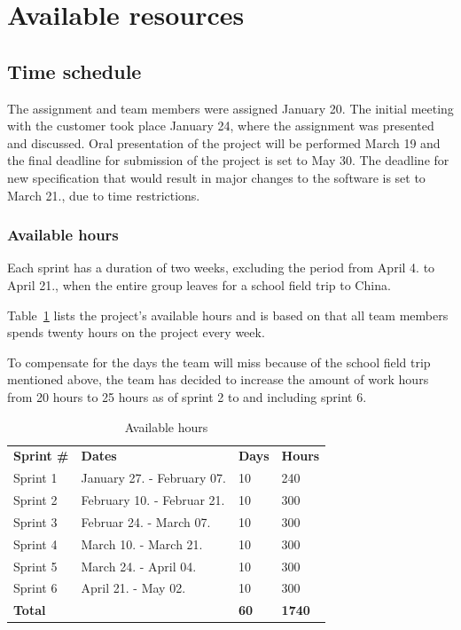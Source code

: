 \section{Available resources}
\subsection{Time schedule}
The assignment and team members were assigned January 20. The initial meeting with the customer took place January 24, where the assignment was presented and discussed. Oral presentation of the project will be performed March 19 and the final deadline for submission of the project is set to May 30. The deadline for new specification that would result in major changes to the software is set to March 21., due to time restrictions.

\subsubsection{Available hours}
Each sprint has a duration of two weeks, excluding the period from April 4. to April 21., when the entire group leaves for a school field trip to China.

Table~\ref{tab:availHours} lists the project's available hours and is based on that all team members spends twenty hours on the project every week.

To compensate for the days the team will miss because of the school field trip mentioned above, the team has decided to increase the amount of work hours from 20 hours to 25 hours as of sprint 2 to and including sprint 6.

\begin{table}[H]
\centering
{}
\begin{tabular}{|l|l|l|l|}
\hline
\textbf{Sprint \#} & \textbf{Dates} & \textbf{Days} & \textbf{Hours}\\
Sprint 1& January 27. - February 07. & 10  & 240 \\
Sprint 2 & February 10. - Februar 21. &10  & 300 \\
Sprint 3 & Februar 24. - March 07. &10 & 300 \\
Sprint 4 & March 10. - March 21. &10  &300 \\
Sprint 5 & March 24. - April 04. &10&  300 \\
Sprint 6 & April 21. - May 02. &10  &300 \\
\textbf{Total}&& \textbf{60}&  \textbf{1740}\\\hline
\end{tabular}
\caption{Available hours}
\label{tab:availHours}
\end{table}

